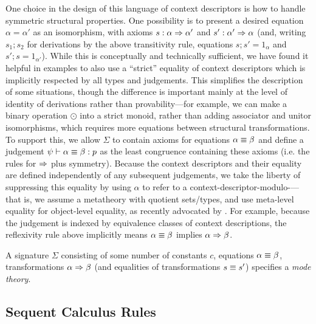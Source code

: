 One choice in the design of this language of context descriptors is how
to handle symmetric structural properties.  One possibility is to
present a desired equation $\alpha = \alpha'$ as an isomorphism, with
axioms $s : \alpha \Rightarrow \alpha'$ and $s' : \alpha' \Rightarrow \alpha$ (and,
writing $s_1;s_2$ for derivations by the above transitivity rule,
equations $s;s' = 1_{\alpha}$ and $s';s = 1_{\alpha'}$).  While this is
conceptually and technically sufficient, we have found it helpful in
examples to also use a ``strict'' equality of context descriptors which
is implicitly respected by all types and judgements.  This simplifies
the description of some situations, though the difference is important
mainly at the level of identity of derivations rather than
provability---for example, we can make a binary operation $\odot$ into a
strict monoid, rather than adding associator and unitor isomorphisms,
which requires more equations between structural transformations.  To
support this, we allow $\Sigma$ to contain axioms for equations $\alpha
\equiv \beta$ and define a judgement $\psi \vdash \alpha \equiv \beta : p$
as the least congruence containing these axioms (i.e. the rules for
$\Rightarrow$ plus symmetry).  Because the context descriptors and their
equality are defined independently of any subsequent judgements, we take
the liberty of suppressing this equality by using $\alpha$ to refer to a
context-descriptor-modulo-\deq---that is, we assume a metatheory with
quotient sets/types, and use meta-level equality for object-level
equality, as recently advocated by \citet{altenkirchkaposi16qit}.  For
example, because the judgement  is indexed
by equivalence classes of context descriptions, the reflexivity rule
above implicitly means $\alpha \equiv \beta$ implies $\alpha \Rightarrow \beta$.

A signature $\Sigma$ consisting of some number of constants $c$,
equations $\alpha \equiv \beta$, transformations $\alpha \Rightarrow \beta$ (and
equalities of transformations $s \equiv s'$) specifies a \emph{mode theory}.

\subsection{Sequent Calculus Rules}

